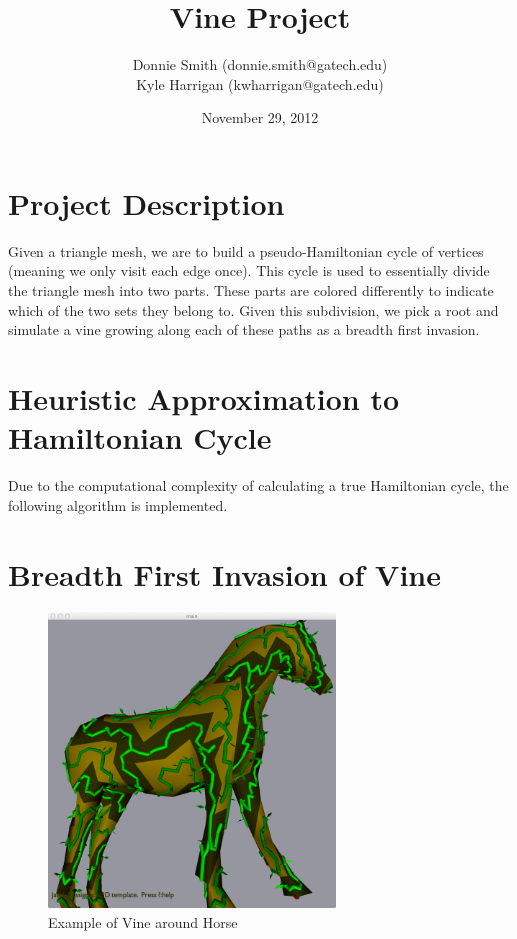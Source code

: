 \documentclass[letterpaper,10pt]{IEEEtran}
\title{Vine Project}
\author{
Donnie Smith (donnie.smith@gatech.edu) \\
Kyle Harrigan (kwharrigan@gatech.edu) 
}
\date{November 29, 2012}                                           %
\begin{document}


\maketitle

 
 
 




\section{Project Description}

Given a triangle mesh, we are to build a pseudo-Hamiltonian cycle of vertices (meaning we only visit each edge once).   This cycle is used to essentially divide the triangle mesh into two parts.  These parts are colored differently to indicate which of the two sets they belong to.  Given this subdivision, we pick a root and simulate a vine growing along each of these paths as a breadth first invasion. 

\section{Heuristic Approximation to Hamiltonian Cycle }

Due to the computational complexity of calculating a true Hamiltonian cycle, the following algorithm   is implemented. 

\section{Breadth First Invasion of Vine}


\begin{figure}[!h]
\centering
\includegraphics[width=3in]{data/vine}
\caption{Example of Vine around Horse}
\label{fig_angle}
\end{figure}
\end{document}
